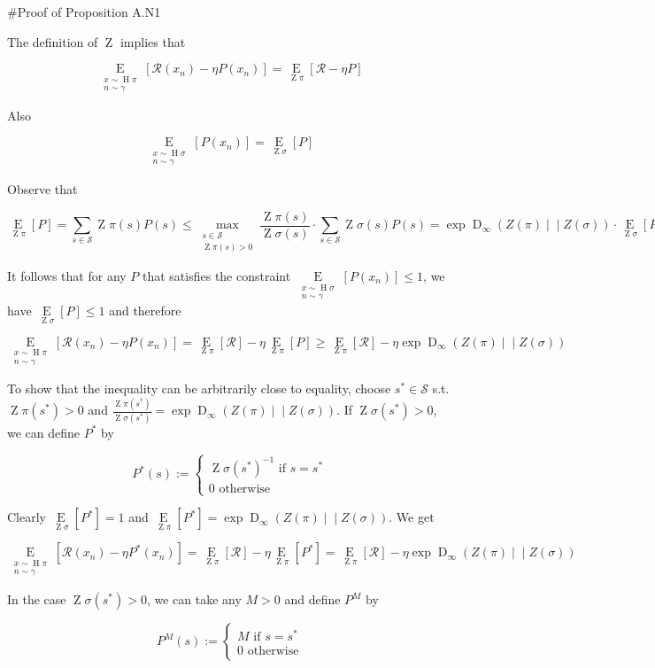 \documentclass[a4paper]{article}
\newcommand{\AP}[1]{\left(#1\right)}
\newcommand{\AB}[1]{\left[#1\right]}
\newcommand{\Ea}[2]{\underset{#1}{\operatorname{E}}\AB{#2}}
\newcommand{\RD}[3]{\operatorname{D}_{#1}\AP{#2\middle\vert\middle\vert#3}}
\newcommand{\St}{\mathcal{S}}
\newcommand{\R}{\mathcal{R}}
\newcommand{\Pe}{P}
\DeclareMathOperator{\Hi}{H}
\DeclareMathOperator{\Z}{Z}
\begin{document}
\#Proof of Proposition A.N1

The definition of $\Z$ implies that

$$\Ea{\substack{x\sim\Hi{\pi}\\n\sim\gamma}}{\R\AP{x_n}-\eta\Pe\AP{x_n}}=\Ea{\Z{\pi}}{\R-\eta P}$$

Also

$$\Ea{\substack{x\sim\Hi{\sigma}\\n\sim\gamma}}{\Pe\AP{x_n}}=\Ea{\Z{\sigma}}{P}$$

Observe that

$$\Ea{\Z{\pi}}{P} = \sum_{s\in\St}\Z{\pi}(s)P(s) \leq \max_{\substack{s \in \St \\ \Z{\pi}(s) > 0}}\frac{\Z{\pi}(s)}{\Z{\sigma}(s)}\cdot\sum_{s\in\St}\Z{\sigma}(s)P(s) = \exp{\RD{\infty}{Z(\pi)}{Z(\sigma)}} \cdot \Ea{\Z{\sigma}}{P}$$

It follows that for any $P$ that satisfies the constraint $\Ea{\substack{x\sim\Hi{\sigma}\\n\sim\gamma}}{\Pe\AP{x_n}} \leq 1$, we have $\Ea{\Z{\sigma}}{\Pe} \leq 1$ and therefore

$$\Ea{\substack{x\sim\Hi{\pi}\\n\sim\gamma}}{\R\AP{x_n}-\eta\Pe\AP{x_n}} = \Ea{\Z{\pi}}{\R} - \eta \Ea{\Z{\pi}}{\Pe} \geq \Ea{\Z{\pi}}{\R} - \eta\exp{\RD{\infty}{Z(\pi)}{Z(\sigma)}}$$

To show that the inequality can be arbitrarily close to equality, choose $s^* \in \St$ s.t. $\Z{\pi}(s^*) > 0$ and $\frac{\Z{\pi}\AP{s^*}}{\Z{\sigma}\AP{s^*}} = \exp{\RD{\infty}{Z(\pi)}{Z(\sigma)}}$. If $\Z{\sigma}\AP{s^*} > 0$, we can define $\Pe^*$ by

$$\Pe^*(s):=\begin{cases} \Z{\sigma}(s^*)^{-1} \text{ if } s=s^* \\ 0 \text{ otherwise} \end{cases}$$

Clearly $\Ea{\Z{\sigma}}{\Pe^*} = 1$ and $\Ea{\Z{\pi}}{P^*} = \exp{\RD{\infty}{Z(\pi)}{Z(\sigma)}}$. We get

$$\Ea{\substack{x\sim\Hi{\pi}\\n\sim\gamma}}{\R\AP{x_n}-\eta\Pe^*\AP{x_n}} = \Ea{\Z{\pi}}{\R} - \eta \Ea{\Z{\pi}}{\Pe^*} = \Ea{\Z{\pi}}{\R} - \eta\exp{\RD{\infty}{Z(\pi)}{Z(\sigma)}}$$

In the case $\Z{\sigma}\AP{s^*} > 0$, we can take any $M > 0$ and define $\Pe^M$ by

$$\Pe^M(s):=\begin{cases} M \text{ if } s=s^* \\ 0 \text{ otherwise} \end{cases}$$
\end{document}
